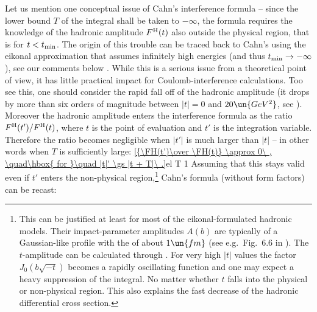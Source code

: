 
Let us mention one conceptual issue of Cahn's interference formula  -- since the lower bound $T$ of the integral shall be taken to $-\infty$, the formula requires the knowledge of the hadronic amplitude $F^{\rm H}(t)$ also outside the physical region, that is for $t < t_{\rm min}$. The origin of this trouble can be traced back to Cahn's using the eikonal approximation that assumes infinitely high energies (and thus $t_{\rm min} \to -\infty$), see our comments below . While this is a serious issue from a theoretical point of view,  it has little practical impact for Coulomb-interference calculations. Too see this, one should consider the rapid fall off of the hadronic amplitude (it drops by more than six orders of magnitude between $|t|=0$ and $20\un{GeV^2}$, see ). Moreover the hadronic amplitude enters the interference formula  as the ratio $F^{\rm H}(t') / F^{\rm H}(t)$, where $t$ is the point of evaluation and $t'$ is the integration variable. Therefore the ratio becomes negligible when $|t'|$ is much larger than $|t|$ -- in other words when $T$ is sufficiently large:
\eqref{{\FH(t')\over \FH(t)} \approx 0\ , \quad\hbox{ for }\quad |t|' \gs |t + T|\ .}{el T 1}
Assuming that this stays valid even if $t'$ enters the non-physical region,\footnote{%
This can be justified at least for most of the eikonal-formulated hadronic models. Their impact-parameter amplitudes $A(b)$ are typically of a Gaussian-like profile with the  of about $1\un{fm}$ (see e.g.~Fig.~6.6 in ). The $t$-amplitude can be calculated through . For very high $|t|$ values the factor $J_0(b\sqrt{-t})$ becomes a rapidly oscillating function and one may expect a heavy suppression of the integral. No matter whether $t$ falls into the physical or non-physical region. This also explains the fast decrease of the hadronic differential cross section. 
} Cahn's formula  (without form factors) can be recast:
